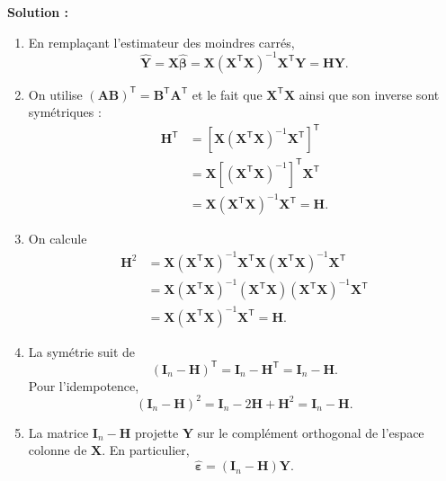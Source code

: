 \documentclass[letter, 11pt]{article}
\newcommand{\bY}{\mathbf{Y}}
\newcommand{\bX}{\mathbf{X}}
\newcommand{\bbeta}{\boldsymbol{\beta}}
\newcommand{\bepsilon}{\boldsymbol{\varepsilon}}
\newcommand{\bH}{\mathbf{H}}
\newcommand{\trans}{^{\mathsf T}}
\newcommand{\prof}[1]{\begin{professeur}\color{blue} {\bf Solution :} #1 \end{professeur}}
\begin{document}
\begin{enumerate}[leftmargin=*, wide, label=\bf Exercice \arabic*:]
\prof{\begin{enumerate}[label=\alph*)]
  \item En remplaçant l'estimateur des moindres carrés,
        \[
        \widehat{\bY}=\bX\widehat{\bbeta}
        =\bX(\bX\trans\bX)^{-1}\bX\trans\bY
        =\bH\bY.
        \]

  \item On utilise $(\mathbf{A}\mathbf{B})\trans
        =\mathbf{B}\trans\mathbf{A}\trans$ et le fait que
        $\bX\trans\bX$ ainsi que son inverse sont symétriques :
        \begin{align*}
        \bH\trans
        &=\left[\bX(\bX\trans\bX)^{-1}\bX\trans\right]\trans\\
        &=\bX\left[(\bX\trans\bX)^{-1}\right]\trans\bX\trans\\
        &=\bX(\bX\trans\bX)^{-1}\bX\trans=\bH.
        \end{align*}

  \item On calcule
        \begin{align*}
        \bH^2
        &=\bX(\bX\trans\bX)^{-1}\bX\trans
          \bX(\bX\trans\bX)^{-1}\bX\trans\\
        &=\bX(\bX\trans\bX)^{-1}
          (\bX\trans\bX)(\bX\trans\bX)^{-1}\bX\trans\\
        &=\bX(\bX\trans\bX)^{-1}\bX\trans=\bH.
        \end{align*}

  \item La symétrie suit de
        \[
          (\mathbf{I}_n-\bH)\trans
          =\mathbf{I}_n-\bH\trans=\mathbf{I}_n-\bH.
        \]
        Pour l'idempotence,
        \[
          (\mathbf{I}_n-\bH)^2
          =\mathbf{I}_n-2\bH+\bH^2
          =\mathbf{I}_n-\bH.
        \]

  \item La matrice $\mathbf{I}_n-\bH$ projette $\bY$ sur le complément
        orthogonal de l'espace colonne de $\bX$. En particulier,
        \[
          \widehat{\bepsilon}=(\mathbf{I}_n-\bH)\bY.
        \]
\end{enumerate}
}


\end{enumerate}
\end{document}
